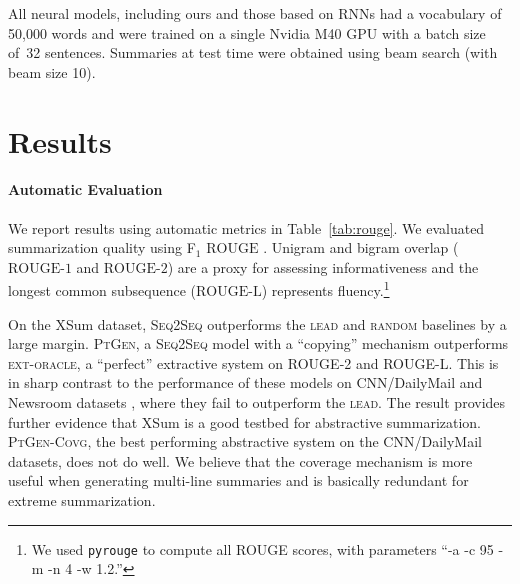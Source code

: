 \documentclass[11pt,a4paper]{article}
\begin{document}
All neural models, including ours and those based on RNNs \cite{see-acl17}
had a vocabulary of 50,000 words and were trained on a single Nvidia
M40 GPU with a batch size of~32 sentences.  Summaries at test time
were obtained using beam search (with beam size 10).

\section{Results}
\label{sec:results}


\paragraph{Automatic Evaluation} 

We report results using automatic metrics in Table~\ref{tab:rouge}.
We evaluated summarization quality using F$_1$ $\mbox{ROUGE}$
\cite{rouge}. Unigram and bigram overlap ($\mbox{ROUGE-1}$ and
$\mbox{ROUGE-2}$) are a proxy for assessing informativeness and the
longest common subsequence ($\mbox{ROUGE-L}$) represents
fluency.\footnote{We used \texttt{pyrouge} to compute all ROUGE
  scores, with parameters ``-a -c 95 -m -n 4 -w 1.2.''}



On the XSum dataset, \textsc{Seq2Seq} outperforms the \textsc{lead}
and \textsc{random} baselines by a large margin. \textsc{PtGen}, a
\textsc{Seq2Seq} model with a ``copying'' mechanism outperforms
\textsc{ext-oracle}, a ``perfect'' extractive system on ROUGE-2 and
ROUGE-L. This is in sharp contrast to the performance of these models
on CNN/DailyMail \cite{see-acl17} and  Newsroom datasets
\cite{newsroom-naacl18}, where they fail to outperform the
\textsc{lead}. The result provides further evidence that XSum is a
good testbed for abstractive summarization. \textsc{PtGen-Covg}, the
best performing abstractive system on the CNN/DailyMail datasets, does
not do well.  We believe that the coverage mechanism is more useful
when generating multi-line summaries and is basically redundant for
extreme summarization. 
\end{document}
